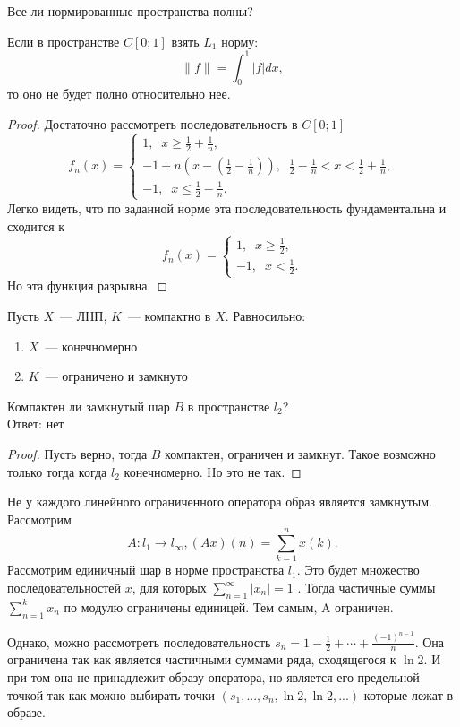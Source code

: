 \begin{counterexample}
    Все ли нормированные пространства полны?

    Если в пространстве $C[0; 1]$ взять $L_1$ норму:
    \[\|f\| = \int_0^1 |f| dx,\]
    то оно не будет полно относительно нее.
\end{counterexample}
\begin{proof}
    Достаточно рассмотреть последовательность в $C[0; 1]$
    \[
    f_n(x) = \begin{cases}
        1,\;\; x \geq \frac{1}{2} + \frac{1}{n},\\
        -1 + n(x-(\frac{1}{2}-\frac{1}{n})),\;\; \frac{1}{2} - \frac{1}{n} < x <  \frac{1}{2} + \frac{1}{n},\\
        -1,\;\; x \leq \frac{1}{2} - \frac{1}{n}.
    \end{cases}
    \]
    Легко видеть, что по заданной норме эта последовательность фундаментальна и сходится к 
    \[
    f_n(x) = \begin{cases}
        1,\;\; x \geq \frac{1}{2},\\
        -1,\;\; x < \frac{1}{2}.
    \end{cases}
    \]
    Но эта функция разрывна.
\end{proof}
\begin{theorem}
    Пусть $X$~--- ЛНП, $K$~--- компактно в $X$. Равносильно:
    \begin{enumerate}
        \item $X$~--- конечномерно
        \item $K$~--- ограничено и замкнуто
    \end{enumerate}
\end{theorem}
\begin{example}
    Компактен ли замкнутый шар $B$ в пространстве $l_2$?\\
    Ответ: нет
\end{example}
\begin{proof}
    Пусть верно, тогда $B$ компактен, ограничен и замкнут. Такое возможно только тогда когда $l_2$ конечномерно. Но это не так.
\end{proof}

\begin{counterexample}
Не у каждого линейного ограниченного оператора образ является замкнутым.
Рассмотрим
\[
A:l_1 \rightarrow l_{\infty}, (Ax)(n)=\sum_{k=1}^n x(k).
\]
Рассмотрим единичный шар в норме пространства $l_1$. Это будет множество последовательностей $x$, для которых $\sum\limits_{n=1}^\infty |x_n| = 1$ . Тогда частичные суммы $\sum\limits_{n=1}^k x_n$ по модулю ограничены единицей. Тем самым, A ограничен.

Однако, можно рассмотреть последовательность $s_n=1-\frac12+\cdots+\frac{(-1)^{n-1}}n$. Она ограничена так как является частичными суммами ряда, сходящегося к $\ln 2$. И при том она не принадлежит образу оператора, но является его предельной точкой так как можно выбирать точки $(s_1,...,s_n,\ln2,\ln2,...)$ которые лежат в образе.
\end{counterexample}